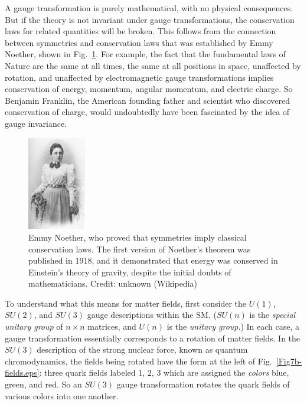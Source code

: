 \documentclass[12pt]{iopart}
\begin{document}
A gauge transformation is purely mathematical, with no physical consequences. But if the theory is not invariant under gauge transformations, the conservation laws for related quantities will be broken. This follows from the connection between symmetries and conservation laws that was established by Emmy Noether, shown in Fig.~\ref{Fig21-Emmy-Noether.eps}. For example, the fact that the fundamental laws of Nature are the same at all times, the same at all positions in space, unaffected by rotation, and unaffected by electromagnetic gauge transformations implies conservation of energy, momentum, angular momentum, and electric charge. So Benjamin Franklin, the American founding father and scientist who discovered conservation of charge, would undoubtedly have been fascinated by the idea of gauge invariance.
\begin{figure}[htbp]
\centering
\includegraphics[bb=0 0 100 600, width=1.0in]{Fig21-Emmy-Noether.eps}
\caption{Emmy Noether, who proved that symmetries imply classical conservation laws. The first version of Noether's theorem was published in 1918, and it demonstrated that energy was conserved in Einstein's theory of gravity, despite the initial doubts of mathematicians. Credit: unknown (Wikipedia) \label{Fig21-Emmy-Noether.eps}}
\end{figure}

To understand what this means for matter fields, first consider the $U \left( 1 \right)$, $SU \left( 2 \right)$, and $SU \left( 3 \right)$ gauge descriptions within the SM. ($SU \left( n \right)$ is the \textit{special unitary group} of $n \times n$ matrices, and $U \left( n \right)$ is the \textit{unitary group}.)  In each case, a gauge transformation essentially corresponds to a rotation of matter fields. In the $SU \left( 3 \right)$ description of the strong nuclear force, known as quantum chromodynamics, the fields being rotated have the form at the left of Fig.~\ref{Fig7b-fields.eps}: three quark fields labeled 1, 2, 3 which are assigned the \textit{colors} blue, green, and red.  So an $SU \left( 3 \right)$ gauge transformation rotates the quark fields of various colors into one another. 
\end{document}
